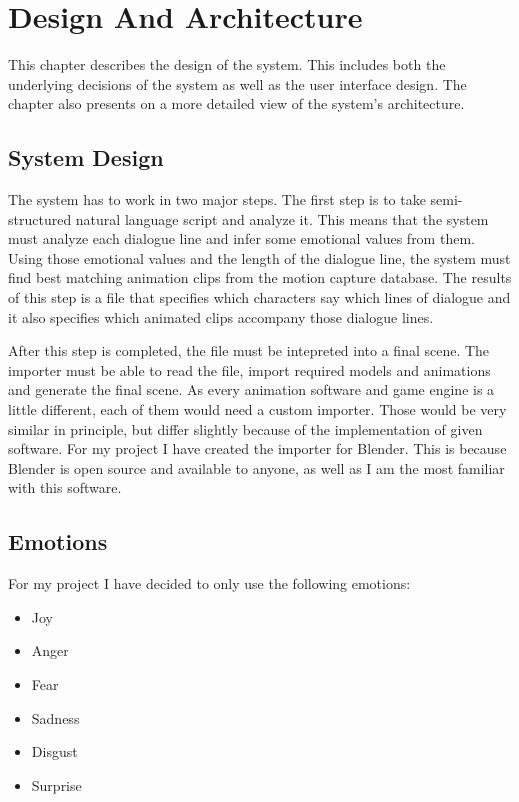 \chapter{Design And Architecture\label{chap:design}}

This chapter describes the design of the system. This includes both the underlying decisions of the system as well as the user interface design. The chapter also presents on a more detailed view of the system's architecture.

\section{System Design}

The system has to work in two major steps. The first step is to take semi-structured natural language script and analyze it. This means that the system must analyze each dialogue line and infer some emotional values from them. Using those emotional values and the length of the dialogue line, the system must find best matching animation clips from the motion capture database. The results of this step is a file that specifies which characters say which lines of dialogue and it also specifies which animated clips accompany those dialogue lines.

After this step is completed, the file must be intepreted into a final scene. The importer must be able to read the file, import required models and animations and generate the final scene. As every animation software and game engine is a little different, each of them would need a custom importer. Those would be very similar in principle, but differ slightly because of the implementation of given software. For my project I have created the importer for Blender. This is because Blender is open source and available to anyone, as well as I am the most familiar with this software.


\section{Emotions}

For my project I have decided to only use the following emotions:
\begin{itemize}
\item Joy
\item Anger
\item Fear
\item Sadness
\item Disgust
\item Surprise
\end{itemize}

